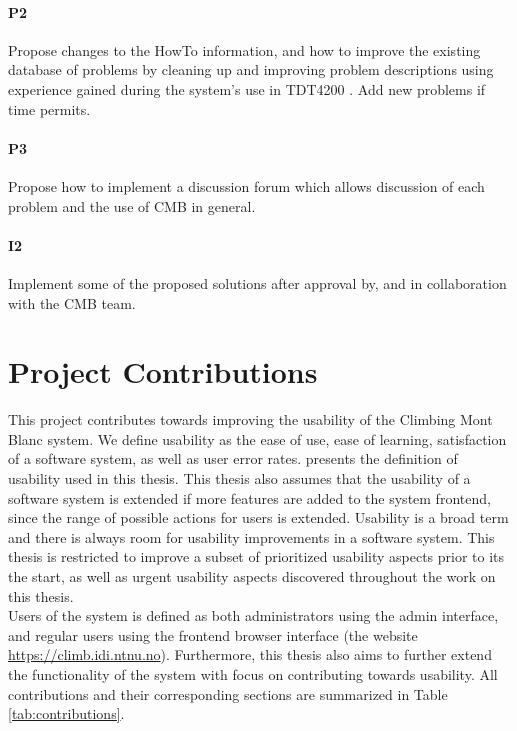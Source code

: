\paragraph*{P2}  Propose changes to the HowTo information, and how to improve the existing database of problems by cleaning up and improving problem descriptions using experience gained during the system's use in TDT4200 \cite{TDT4200}. Add new problems if time permits.

\paragraph*{P3} Propose how to implement a discussion forum which allows discussion of each problem and the use of CMB in general.

\paragraph*{I2} Implement some of the proposed solutions after approval by, and in collaboration with the CMB team. \\

\section{Project Contributions}
\label{sec:cont}
This project contributes towards improving the usability of the Climbing Mont Blanc system. We define usability as the ease of use, ease of learning, satisfaction of a software system, as well as user error rates.  presents the definition of usability used in this thesis. This thesis also assumes that the usability of a software system is extended if more features are added to the system frontend, since the range of possible actions for users is extended. Usability is a broad term and there is always room for usability improvements in a software system. This thesis is restricted to improve a subset of prioritized usability aspects prior to its the start, as well as urgent usability aspects discovered throughout the work on this thesis. \\

Users of the system is defined as both administrators using the admin interface, and regular users using the frontend browser interface (the website \url{https://climb.idi.ntnu.no}). Furthermore, this thesis also aims to further extend the functionality of the system with focus on contributing towards usability. All contributions and their corresponding sections are summarized in Table \ref{tab:contributions}. \\

